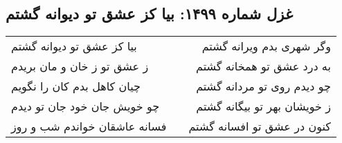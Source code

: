\begin{center}
\section*{غزل شماره ۱۴۹۹: بیا کز عشق تو دیوانه گشتم}
\label{sec:1499}
\begin{longtable}{l p{0.5cm} r}
بیا کز عشق تو دیوانه گشتم
&&
وگر شهری بدم ویرانه گشتم
\\
ز عشق تو ز خان و مان بریدم
&&
به درد عشق تو همخانه گشتم
\\
چیان کاهل بدم کان را نگویم
&&
چو دیدم روی تو مردانه گشتم
\\
چو خویش جان خود جان تو دیدم
&&
ز خویشان بهر تو بیگانه گشتم
\\
فسانه عاشقان خواندم شب و روز
&&
کنون در عشق تو افسانه گشتم
\\
\end{longtable}
\end{center}
